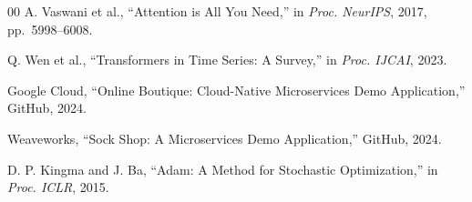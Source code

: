 \documentclass[conference]{IEEEtran}
\begin{document}
\begin{thebibliography}{00}
 A. Vaswani et al., ``Attention is All You Need,'' in \textit{Proc. NeurIPS}, 2017, pp.~5998--6008.

 Q. Wen et al., ``Transformers in Time Series: A Survey,'' in \textit{Proc. IJCAI}, 2023.

 Google Cloud, ``Online Boutique: Cloud-Native Microservices Demo Application,'' GitHub, 2024.

 Weaveworks, ``Sock Shop: A Microservices Demo Application,'' GitHub, 2024.

 D. P. Kingma and J. Ba, ``Adam: A Method for Stochastic Optimization,'' in \textit{Proc. ICLR}, 2015.

\end{thebibliography}
\end{document}

